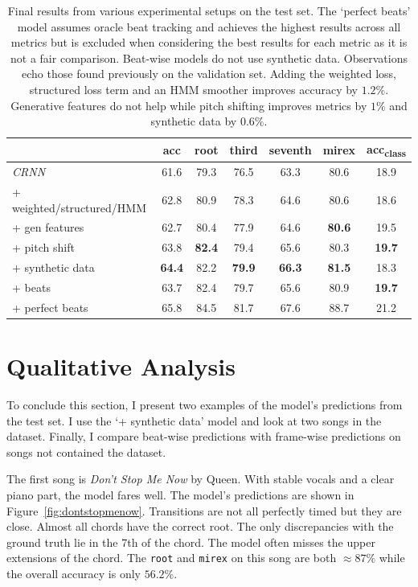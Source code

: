 \begin{table}[H]
    \centering
    \begin{tabular}{lcccccc}
        \toprule
         & acc & root & third & seventh & mirex & acc\textsubscript{class} \\
        \midrule
        \emph{CRNN}               & 61.6  & 79.3  & 76.5  & 63.3  & 80.6  & 18.9 \\
        + weighted/structured/HMM & 62.8  & 80.9  & 78.3  & 64.6  & 80.6  & 18.6 \\
        + gen features           & 62.7  & 80.4  & 77.9  & 64.6  & \textbf{80.6}  & 19.5 \\
        + pitch shift           & 63.8  & \textbf{82.4}  & 79.4  & 65.6  & 80.3  & \textbf{19.7} \\
        + synthetic data         & \textbf{64.4}  & 82.2  & \textbf{79.9}  & \textbf{66.3}  & \textbf{81.5}  & 18.3 \\
        + beats & 63.7  & 82.4  & 79.7  & 65.6  & 80.9  & \textbf{19.7} \\
        \midrule
        + perfect beats          & 65.8  & 84.5  & 81.7  & 67.6  & 88.7  & 21.2 \\
        \bottomrule
    \end{tabular}
    \caption{Final results from various experimental setups on the test set. The `perfect beats' model assumes oracle beat tracking and achieves the highest results across all metrics but is excluded when considering the best results for each metric as it is not a fair comparison. Beat-wise models do not use synthetic data. Observations echo those found previously on the validation set. Adding the weighted loss, structured loss term and an HMM smoother improves accuracy by $1.2\%$. Generative features do not help while pitch shifting improves metrics by $1\%$ and synthetic data by $0.6\%$.}\label{tab:test_set}
\end{table}


\section{Qualitative Analysis}

To conclude this section, I present two examples of the model's predictions from the test set. I use the `+ synthetic data' model and look at two songs in the dataset. Finally, I compare beat-wise predictions with frame-wise predictions on songs not contained the dataset.

The first song is \emph{Don't Stop Me Now} by Queen. With stable vocals and a clear piano part, the model fares well. The model's predictions are shown in Figure~\ref{fig:dontstopmenow}. Transitions are not all perfectly timed but they are close. Almost all chords have the correct root. The only discrepancies with the ground truth lie in the 7th of the chord. The model often misses the upper extensions of the chord. The \texttt{root} and \texttt{mirex} on this song are both $\approx 87\%$ while the overall accuracy is only $56.2\%$.

